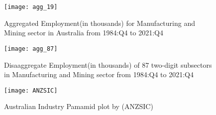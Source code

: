\documentclass{monashthesis}
\begin{document}
\begin{figure}[t]
\texttt{[image: agg\_19]}
\centering
\caption{Aggregated Employment(in thousands) for Manufacturing and Mining sector in Australia from 1984:Q4 to 2021:Q4}
\label{fig:a19}
\end{figure}

\begin{figure}[t]
\texttt{[image: agg\_87]}
\centering
\caption{Disaaggregate Employment(in thousands) of 87 two-digit subsectors in Manufacturing and Mining sector from 1984:Q4 to 2021:Q4}
\label{fig:a87}
\end{figure}

\begin{figure}[t]
\texttt{[image: ANZSIC]}
\centering
\caption{Australian Industry Pamamid plot by (ANZSIC)}
\label{fig:anzsic}
\end{figure}

\printbibliography[heading=bibintoc]
\end{document}
